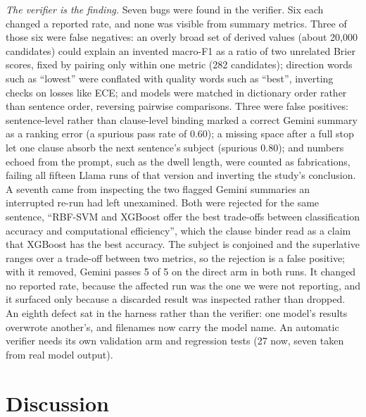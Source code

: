 \documentclass[conference]{IEEEtran}
\begin{document}
\emph{The verifier is the finding.} Seven bugs were found in the verifier. Six each changed a reported rate, and none was visible from summary metrics. Three of those six were false negatives: an overly broad set of derived values (about 20,000 candidates) could explain an invented macro-F1 as a ratio of two unrelated Brier scores, fixed by pairing only within one metric (282 candidates); direction words such as ``lowest'' were conflated with quality words such as ``best'', inverting checks on losses like ECE; and models were matched in dictionary order rather than sentence order, reversing pairwise comparisons. Three were false positives: sentence-level rather than clause-level binding marked a correct Gemini summary as a ranking error (a spurious pass rate of 0.60); a missing space after a full stop let one clause absorb the next sentence's subject (spurious 0.80); and numbers echoed from the prompt, such as the dwell length, were counted as fabrications, failing all fifteen Llama runs of that version and inverting the study's conclusion. A seventh came from inspecting the two flagged Gemini summaries an interrupted re-run had left unexamined. Both were rejected for the same sentence, ``RBF-SVM and XGBoost offer the best trade-offs between classification accuracy and computational efficiency'', which the clause binder read as a claim that XGBoost has the best accuracy. The subject is conjoined and the superlative ranges over a trade-off between two metrics, so the rejection is a false positive; with it removed, Gemini passes 5 of 5 on the direct arm in both runs. It changed no reported rate, because the affected run was the one we were not reporting, and it surfaced only because a discarded result was inspected rather than dropped. An eighth defect sat in the harness rather than the verifier: one model's results overwrote another's, and filenames now carry the model name. An automatic verifier needs its own validation arm and regression tests (27 now, seven taken from real model output).

\section{Discussion}
\end{document}
